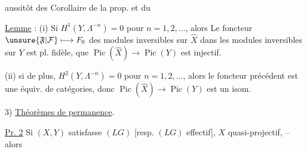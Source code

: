 
 aussitôt des
Corollaire de la prop. et du

\uline{Lemme} : 
(i) Si $H^1(Y,\Lambda^{-n})=0$ pour $n=1,2,\ldots$,
alors  Le foncteur
$\unsure{\mathfrak F|\mathcal F}\longmapsto F_0$ des modules
 inversibles sur $\hat X$ dans les modules
inversibles sur $Y$ est pl. fidèle,
 que
$\operatorname{Pic}(\hat X)\longrightarrow\operatorname{Pic}(Y)$
est injectif.

(ii) si de plus, $H^2(Y,\Lambda^{-n})=0$ pour $n=1,2,\ldots$,
alors le foncteur précédent est une équiv. de catégories,
donc $\operatorname{Pic}(\hat X)\longrightarrow\operatorname{Pic}(Y)$
est un isom.

3) \uline{Théorèmes de permanence}.


\uline{Pr. 2} Si $(X,Y)$ satisfasse $(LG)$
[resp. $(LG)$ effectif],  $X$ quasi-projectif,
-- alors

